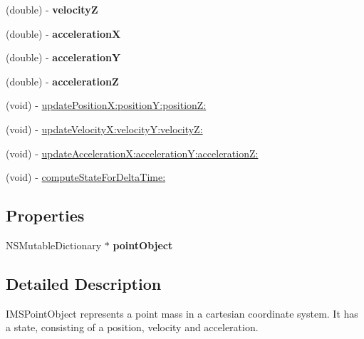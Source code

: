 \begin{CompactItemize}
\item 
\hypertarget{interface_i_m_s_r_point_object_636f2945fc3a05da91d704d711c464fd}{
(double) - \textbf{velocityZ}}
\label{interface_i_m_s_r_point_object_636f2945fc3a05da91d704d711c464fd}

\item 
\hypertarget{interface_i_m_s_r_point_object_7690061c005565dbdef6f781ec0c9f86}{
(double) - \textbf{accelerationX}}
\label{interface_i_m_s_r_point_object_7690061c005565dbdef6f781ec0c9f86}

\item 
\hypertarget{interface_i_m_s_r_point_object_25d5c42122d6286497f406cb008a6649}{
(double) - \textbf{accelerationY}}
\label{interface_i_m_s_r_point_object_25d5c42122d6286497f406cb008a6649}

\item 
\hypertarget{interface_i_m_s_r_point_object_a00358291fe8853c9e039c40e1920594}{
(double) - \textbf{accelerationZ}}
\label{interface_i_m_s_r_point_object_a00358291fe8853c9e039c40e1920594}

\item 
(void) - \hyperlink{interface_i_m_s_r_point_object_151a5fa0c67135b90a0de70b061276c3}{updatePositionX:positionY:positionZ:}
\item 
(void) - \hyperlink{interface_i_m_s_r_point_object_55fbe7e8642006b44ebeedc850b5c728}{updateVelocityX:velocityY:velocityZ:}
\item 
(void) - \hyperlink{interface_i_m_s_r_point_object_1a32028d39d5f3e7fd976cac12040a54}{updateAccelerationX:accelerationY:accelerationZ:}
\item 
(void) - \hyperlink{interface_i_m_s_r_point_object_ae14396d83b2edd2f34b0bfb0f35a501}{computeStateForDeltaTime:}
\end{CompactItemize}
\subsection*{Properties}
\begin{CompactItemize}
\item 
\hypertarget{interface_i_m_s_r_point_object_d480bf9c62356db805af3b924b766c84}{
NSMutableDictionary $\ast$ \textbf{pointObject}}
\label{interface_i_m_s_r_point_object_d480bf9c62356db805af3b924b766c84}

\end{CompactItemize}


\subsection{Detailed Description}
IMSPointObject represents a point mass in a cartesian coordinate system. It has a state, consisting of a position, velocity and acceleration.

